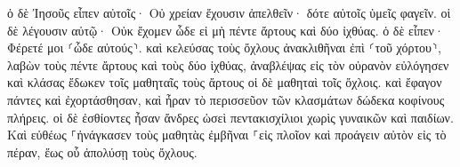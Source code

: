 \documentclass{openreader}
\begin{document}
ὁ δὲ Ἰησοῦς εἶπεν αὐτοῖς· Οὐ χρείαν ἔχουσιν ἀπελθεῖν· δότε αὐτοῖς ὑμεῖς φαγεῖν. 
οἱ δὲ λέγουσιν αὐτῷ· Οὐκ ἔχομεν ὧδε εἰ μὴ πέντε ἄρτους καὶ δύο ἰχθύας. 
ὁ δὲ εἶπεν· Φέρετέ μοι ⸂ὧδε αὐτούς⸃. 
καὶ κελεύσας τοὺς ὄχλους ἀνακλιθῆναι ἐπὶ ⸂τοῦ χόρτου⸃, λαβὼν τοὺς πέντε ἄρτους καὶ τοὺς δύο ἰχθύας, ἀναβλέψας εἰς τὸν οὐρανὸν εὐλόγησεν καὶ κλάσας ἔδωκεν τοῖς μαθηταῖς τοὺς ἄρτους οἱ δὲ μαθηταὶ τοῖς ὄχλοις. 
καὶ ἔφαγον πάντες καὶ ἐχορτάσθησαν, καὶ ἦραν τὸ περισσεῦον τῶν κλασμάτων δώδεκα κοφίνους πλήρεις. 
οἱ δὲ ἐσθίοντες ἦσαν ἄνδρες ὡσεὶ πεντακισχίλιοι χωρὶς γυναικῶν καὶ παιδίων. 
Καὶ εὐθέως ⸀ἠνάγκασεν τοὺς μαθητὰς ἐμβῆναι ⸀εἰς πλοῖον καὶ προάγειν αὐτὸν εἰς τὸ πέραν, ἕως οὗ ἀπολύσῃ τοὺς ὄχλους. 
\end{document}
